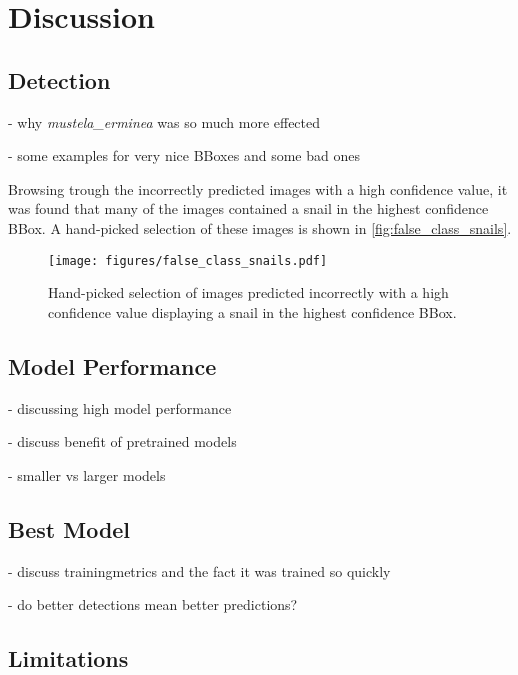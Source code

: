 


\section{Discussion}
\label{discussion}

\subsection{Detection}
- why \textit{mustela\_erminea} was so much more effected

- some examples for very nice BBoxes and some bad ones

Browsing trough the incorrectly predicted images with a high confidence value, it was found that many of the images contained a snail in the highest confidence BBox. A hand-picked selection of these images is shown in \autoref{fig:false_class_snails}.


\begin{figure}[]
\centering
\texttt{[image: figures/false\_class\_snails.pdf]}
\caption{Hand-picked selection of images predicted incorrectly with a high confidence value displaying a snail in the highest confidence BBox.}
\label{fig:false_class_snails}
\end{figure}

\subsection{Model Performance}
- discussing high model performance

- discuss benefit of pretrained models

- smaller vs larger models

\subsection{Best Model}

- discuss trainingmetrics and the fact it was trained so quickly

- do better detections mean better predictions?



\subsection{Limitations}

